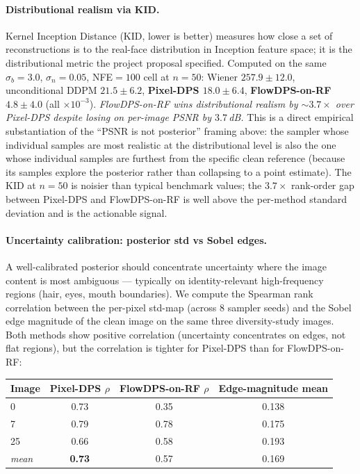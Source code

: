 \documentclass{article}
\begin{document}
\paragraph{Distributional realism via KID.}
Kernel Inception Distance (KID, lower is better) measures how close a
set of reconstructions is to the real-face distribution in Inception
feature space; it is the distributional metric the project proposal
specified. Computed on the same $\sigma_b{=}3.0$, $\sigma_n{=}0.05$,
NFE${=}100$ cell at $n{=}50$:
Wiener $257.9 \pm 12.0$, unconditional DDPM $21.5 \pm 6.2$,
\textbf{Pixel-DPS $18.0 \pm 6.4$}, \textbf{FlowDPS-on-RF
$\boldsymbol{4.8 \pm 4.0}$} (all $\times 10^{-3}$). \emph{FlowDPS-on-RF
wins distributional realism by $\sim 3.7\times$ over Pixel-DPS
despite losing on per-image PSNR by $3.7$\,dB.} This is a direct
empirical substantiation of the ``PSNR is not posterior'' framing
above: the sampler whose individual samples are most realistic at the
distributional level is also the one whose individual samples are
furthest from the specific clean reference (because its samples
explore the posterior rather than collapsing to a point estimate).
The KID at $n{=}50$ is noisier than typical benchmark values; the
$3.7\times$ rank-order gap between Pixel-DPS and FlowDPS-on-RF is
well above the per-method standard deviation and is the actionable
signal.

\paragraph{Uncertainty calibration: posterior std vs Sobel edges.}
A well-calibrated posterior should concentrate uncertainty where the
image content is most ambiguous --- typically on identity-relevant
high-frequency regions (hair, eyes, mouth boundaries). We compute
the Spearman rank correlation between the per-pixel std-map (across
8 sampler seeds) and the Sobel edge magnitude of the clean image
on the same three diversity-study images. Both methods show positive
correlation (uncertainty concentrates on edges, not flat regions),
but the correlation is tighter for Pixel-DPS than for FlowDPS-on-RF:

\begin{center}
\begin{tabular}{lccc}
  \toprule
  Image & Pixel-DPS $\rho$ & FlowDPS-on-RF $\rho$ & Edge-magnitude mean \\
  \midrule
  0  & 0.73 & 0.35 & 0.138 \\
  7  & 0.79 & 0.78 & 0.175 \\
  25 & 0.66 & 0.58 & 0.193 \\
  \midrule
  \textit{mean} & \textbf{0.73} & 0.57 & 0.169 \\
  \bottomrule
\end{tabular}
\end{center}
\end{document}
